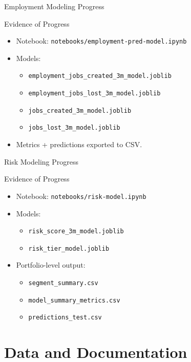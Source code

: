 \documentclass[10pt]{beamer}
\begin{document}
\begin{frame}{Employment Modeling Progress}
\begin{block}{Evidence of Progress}
\begin{itemize}
    \item Notebook: \texttt{notebooks/employment-pred-model.ipynb}
    \item Models:
        \begin{itemize}
            \item \texttt{employment\_jobs\_created\_3m\_model.joblib}
            \item \texttt{employment\_jobs\_lost\_3m\_model.joblib}
            \item \texttt{jobs\_created\_3m\_model.joblib}
            \item \texttt{jobs\_lost\_3m\_model.joblib}
        \end{itemize}
    \item Metrics + predictions exported to CSV.
\end{itemize}
\end{block}
\end{frame}

\begin{frame}{Risk Modeling Progress}
\begin{block}{Evidence of Progress}
\begin{itemize}
    \item Notebook: \texttt{notebooks/risk-model.ipynb}
    \item Models:
        \begin{itemize}
            \item \texttt{risk\_score\_3m\_model.joblib}
            \item \texttt{risk\_tier\_model.joblib}
        \end{itemize}
    \item Portfolio-level output:
        \begin{itemize}
            \item \texttt{segment\_summary.csv}
            \item \texttt{model\_summary\_metrics.csv}
            \item \texttt{predictions\_test.csv}
        \end{itemize}
\end{itemize}
\end{block}
\end{frame}

\section{Data and Documentation}
\end{document}

